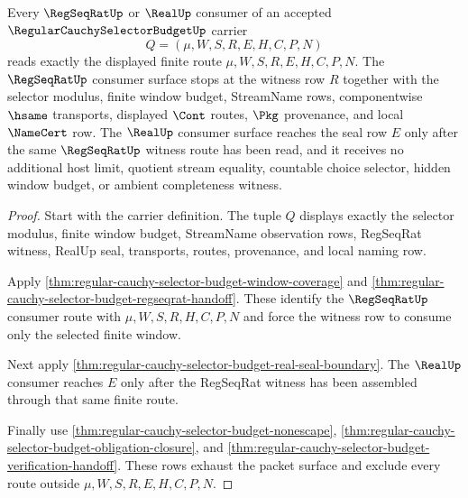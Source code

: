 \begin{theorem}
\label{thm:regular-cauchy-selector-budget-consumer-exactness}
Every $\RegSeqRatUp$ or $\RealUp$ consumer of an accepted $\RegularCauchySelectorBudgetUp$ carrier
$$
Q=(\mu,W,S,R,E,H,C,P,N)
$$
reads exactly the displayed finite route $\mu,W,S,R,E,H,C,P,N$. The $\RegSeqRatUp$ consumer surface stops at the witness row $R$ together with the selector modulus, finite window budget, StreamName rows, componentwise $\hsame$ transports, displayed $\Cont$ routes, $\Pkg$ provenance, and local $\NameCert$ row. The $\RealUp$ consumer surface reaches the seal row $E$ only after the same $\RegSeqRatUp$ witness route has been read, and it receives no additional host limit, quotient stream equality, countable choice selector, hidden window budget, or ambient completeness witness.
\end{theorem}
\begin{proof}
Start with the carrier definition. The tuple $Q$ displays exactly the selector modulus, finite window budget, StreamName observation rows, RegSeqRat witness, RealUp seal, transports, routes, provenance, and local naming row.

Apply \autoref{thm:regular-cauchy-selector-budget-window-coverage} and \autoref{thm:regular-cauchy-selector-budget-regseqrat-handoff}. These identify the $\RegSeqRatUp$ consumer route with $\mu,W,S,R,H,C,P,N$ and force the witness row to consume only the selected finite window.

Next apply \autoref{thm:regular-cauchy-selector-budget-real-seal-boundary}. The $\RealUp$ consumer reaches $E$ only after the RegSeqRat witness has been assembled through that same finite route.

Finally use \autoref{thm:regular-cauchy-selector-budget-nonescape}, \autoref{thm:regular-cauchy-selector-budget-obligation-closure}, and \autoref{thm:regular-cauchy-selector-budget-verification-handoff}. These rows exhaust the packet surface and exclude every route outside $\mu,W,S,R,E,H,C,P,N$.
\end{proof}

